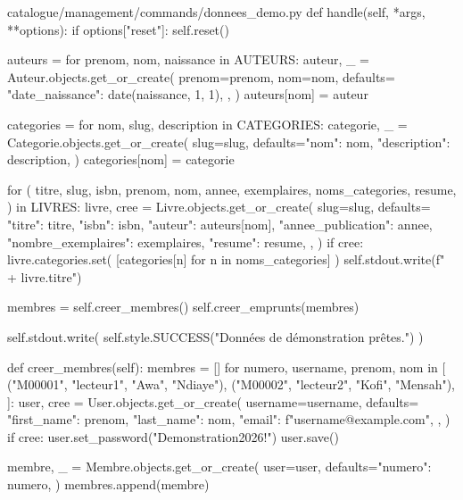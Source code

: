 \begin{codebox}[python]{catalogue/management/commands/donnees\_demo.py}
    def handle(self, *args, **options):
        if options["reset"]:
            self.reset()

        auteurs = {}
        for prenom, nom, naissance in AUTEURS:
            auteur, _ = Auteur.objects.get_or_create(
                prenom=prenom,
                nom=nom,
                defaults={
                    "date_naissance": date(naissance, 1, 1),
                },
            )
            auteurs[nom] = auteur

        categories = {}
        for nom, slug, description in CATEGORIES:
            categorie, _ = Categorie.objects.get_or_create(
                slug=slug,
                defaults={"nom": nom, "description": description},
            )
            categories[nom] = categorie

        for (
            titre,
            slug,
            isbn,
            prenom,
            nom,
            annee,
            exemplaires,
            noms_categories,
            resume,
        ) in LIVRES:
            livre, cree = Livre.objects.get_or_create(
                slug=slug,
                defaults={
                    "titre": titre,
                    "isbn": isbn,
                    "auteur": auteurs[nom],
                    "annee_publication": annee,
                    "nombre_exemplaires": exemplaires,
                    "resume": resume,
                },
            )
            if cree:
                livre.categories.set(
                    [categories[n] for n in noms_categories]
                )
                self.stdout.write(f"  + {livre.titre}")

        membres = self.creer_membres()
        self.creer_emprunts(membres)

        self.stdout.write(
            self.style.SUCCESS("Données de démonstration prêtes.")
        )

    def creer_membres(self):
        membres = []
        for numero, username, prenom, nom in [
            ("M00001", "lecteur1", "Awa", "Ndiaye"),
            ("M00002", "lecteur2", "Kofi", "Mensah"),
        ]:
            user, cree = User.objects.get_or_create(
                username=username,
                defaults={
                    "first_name": prenom,
                    "last_name": nom,
                    "email": f"{username}@example.com",
                },
            )
            if cree:
                user.set_password("Demonstration2026!")
                user.save()

            membre, _ = Membre.objects.get_or_create(
                user=user,
                defaults={"numero": numero},
            )
            membres.append(membre)


\end{codebox}
